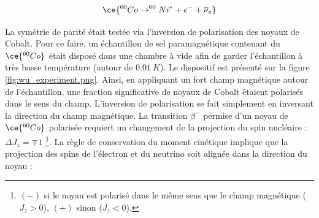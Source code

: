 \begin{equation}
    \ce{^{60}Co \rightarrow ^{60}Ni^* + e^- + \overline{\nu}_e}
\end{equation}


\bigbreak

La symétrie de parité était testée via l'inversion de polarisation des noyaux de Cobalt. Pour ce faire, un échantillon de sel paramagnétique contenant du $\ce{^{60}Co}$ était disposé dans une chambre à vide afin de garder l'échantillon à très basse température (autour de $\SI{0.01}{K}$). Le dispositif est présenté sur la figure \ref{fig:wu_experiment.png}. Ainsi, en appliquant un fort champ magnétique autour de l'échantillon, une fraction significative de noyaux de Cobalt étaient polarisés dans le sens du champ. L'inversion de polarisation se fait simplement en inversant la direction du champ magnétique. La transition $\beta^-$ permise d'un noyau de $\ce{^{60}Co}$ polarisée requiert un changement de la projection du spin nucléaire : $\Delta J_z = \mp 1$ \footnote{$(-)$ si le noyau est polarisé dans le même sens que le champ magnétique ($J_z > 0$), $(+)$ sinon ($J_z < 0$).}. La règle de conservation du moment cinétique implique que la projection des spins de l'électron et du neutrino soit alignée dans la direction du noyau :

